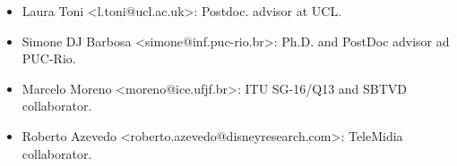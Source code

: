 
\begin{itemize}[nosep]
    \item Laura Toni <l.toni@ucl.ac.uk>: Postdoc. advisor at UCL.
    
    
    \item Simone DJ Barbosa <simone@inf.puc-rio.br>: Ph.D. and PostDoc advisor ad PUC-Rio.
    
    \item Marcelo Moreno <moreno@ice.ufjf.br>: ITU SG-16/Q13 and SBTVD collaborator. 
    
    \item Roberto Azevedo <roberto.azevedo@disneyresearch.com>: TeleMidia collaborator. 
    
    
    
  \end{itemize}